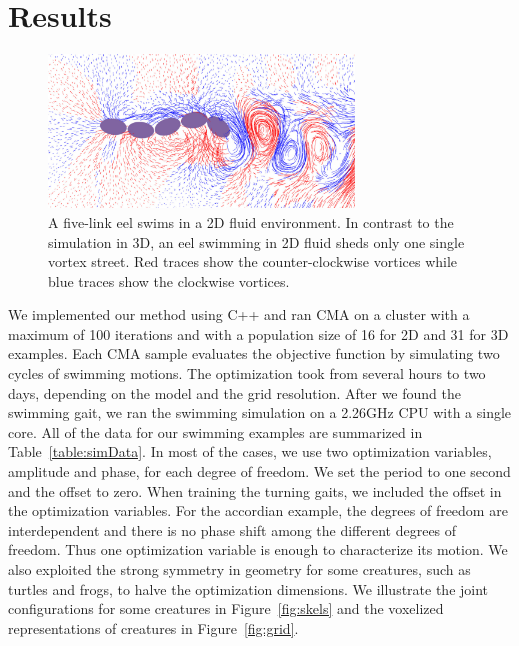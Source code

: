 \section{Results}

\begin{figure}[!b]
\centering
\includegraphics[width=3.2in]{figures/eel2D.eps}
\caption{A five-link eel swims in a 2D fluid environment. In contrast to the simulation in 3D, an eel swimming in 2D fluid sheds only one single vortex street. Red traces show the counter-clockwise vortices while blue traces show the clockwise vortices.}
\label{fig:eel2D}
\end{figure}

We implemented our method using C++ and ran CMA on a cluster with a
maximum of 100 iterations and with a population size of 16 for 2D and 31 for 3D
examples. Each CMA sample evaluates the objective function by simulating
two cycles of swimming motions. The optimization took from several hours
to two days, depending on the model and the grid resolution. After we
found the swimming gait, we ran the swimming simulation on a 2.26GHz CPU
with a single core.  All of the data for our swimming examples are
summarized in Table~\ref{table:simData}. In most of the cases, we use two
optimization variables, amplitude and phase, for each degree of freedom.
We set the period to one second and the offset to zero. When training the
turning gaits, we included the offset in the optimization variables. For the
accordian example, the degrees of freedom are interdependent and there is
no phase shift among the different degrees of freedom. Thus one
optimization variable is enough to characterize its motion. We also
exploited the strong symmetry in geometry for some creatures, such as
turtles and frogs, to halve the optimization dimensions. We illustrate the
joint configurations for some creatures in Figure~\ref{fig:skels} and the voxelized representations of creatures in Figure~\ref{fig:grid}.

